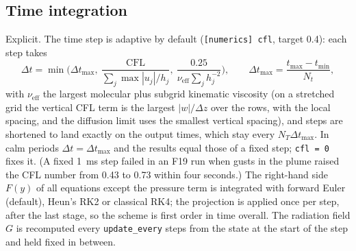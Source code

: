 \documentclass[11pt,a4paper]{article}
\newcommand{\code}[1]{\texttt{#1}}
\begin{document}
\subsection{Time integration}
Explicit. The time step is adaptive by default (\code{[numerics] cfl}, target 0.4): each step takes
\begin{equation}
  \Delta t = \min\Big(\Delta t_\text{max},\ \frac{\mathrm{CFL}}{\sum_j\max|u_j|/h_j},\
  \frac{0.25}{\nu_\text{eff}\sum_j h_j^{-2}}\Big),\qquad \Delta t_\text{max}=\frac{t_\text{max}-t_\text{min}}{N_t},
\end{equation}
with $\nu_\text{eff}$ the largest molecular plus subgrid kinematic viscosity (on a stretched grid
the vertical CFL term is the largest $|w|/\Delta z$ over the rows, with the local spacing, and the diffusion
limit uses the smallest vertical spacing), and steps are
shortened to land exactly on the output times, which stay every $N_T\Delta t_\text{max}$. In calm periods
$\Delta t=\Delta t_\text{max}$ and the results equal those of a fixed step; \code{cfl = 0} fixes it. (A fixed
1~ms step failed in an F19 run when gusts in the plume raised the CFL number from 0.43 to 0.73 within
four seconds.) The right-hand side $F(y)$ of all equations except the pressure term is integrated with
forward Euler (default), Heun's RK2 or classical RK4; the projection is applied once per step, after
the last stage, so the scheme is first order in time overall. The radiation field $G$ is recomputed
every \code{update\_every} steps from the state at the start of the step and held fixed in between.
\end{document}
